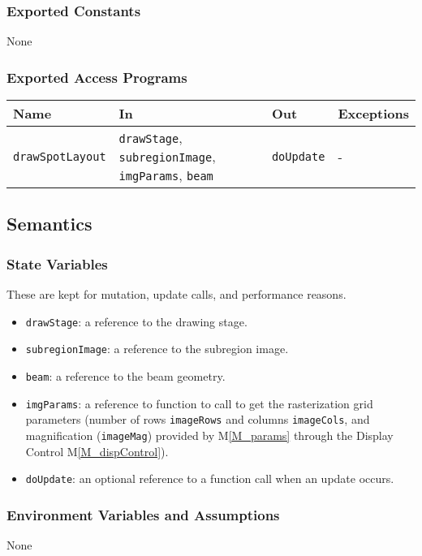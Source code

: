 \documentclass[12pt, titlepage]{article}
\newcommand{\mref}[1]{M\ref{#1}}
\newcommand{\code}[1]{\texttt{#1}}
\begin{document}
\subsubsection{Exported Constants}
None
\subsubsection{Exported Access Programs}

\begin{center}
\begin{tabular}{p{4cm} p{4cm} p{4cm} p{2cm}}
\hline
\textbf{Name} & \textbf{In} & \textbf{Out} & \textbf{Exceptions} \\
\hline
\code{drawSpotLayout} & \code{drawStage}, \code{subregionImage}, \code{imgParams}, \code{beam}
  & \code{doUpdate} & - \\
\hline
\end{tabular}
\end{center}

\subsection{Semantics}

\subsubsection{State Variables}
These are kept for mutation, update calls, and performance reasons.
\begin{itemize}
  \item \code{drawStage}: a reference to the drawing stage.
  \item \code{subregionImage}: a reference to the subregion image.
  \item \code{beam}: a reference to the beam geometry.
  \item \code{imgParams}: a reference to function to call to get the rasterization
    grid parameters (number of rows \code{imageRows} and columns \code{imageCols},
    and magnification (\code{imageMag}) 
    provided by \mref{M_params}
    through the Display Control \mref{M_dispControl}).
  \item \code{doUpdate}: an optional reference to a function call when an update occurs.
\end{itemize}

\subsubsection{Environment Variables and Assumptions}
None
\end{document}
